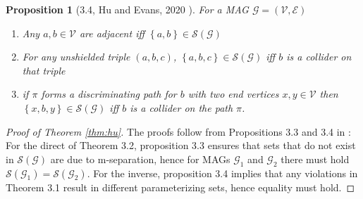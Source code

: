 \documentclass[a4paper]{article}
\newtheorem{proposition}{Proposition}
\begin{document}
\begin{proposition}[3.4, Hu and Evans, 2020 \cite{hu2020}]For a MAG $\mathcal{G} = (\mathcal{V},\mathcal{E})$
	\begin{enumerate}
		\item Any $a,b \in \mathcal{V}$ are adjacent iff $\left\{ a, b\right\} \in \mathcal{S}(\mathcal{G})$
		\item For any unshielded triple $(a,b,c)$, $\left\{ a, b, c \right\} \in \mathcal{S}(\mathcal{G})$ iff $b$ is a collider on that triple
		\item if $\pi$ forms a discriminating path for $b$ with two end vertices $x,y \in \mathcal{V}$ then $\left\{ x, b, y\right\} \in \mathcal{S}(\mathcal{G})$ iff $b$ is a collider on the path $\pi$. 
	\end{enumerate}
	
\end{proposition}

\begin{proof}[Proof of Theorem \ref{thm:hu}]
	The proofs follow from Propositions 3.3 and 3.4 in \cite{hu2020}: For the direct of Theorem 3.2, proposition 3.3 ensures that sets that do not exist in $\mathcal{S}(\mathcal{G})$ are due to m-separation, hence for MAGs $\mathcal{G}_1$ and $\mathcal{G}_2$ there must hold $\mathcal{S}(\mathcal{G}_1) = \mathcal{S}(\mathcal{G}_2)$. For the inverse, proposition 3.4 implies that any violations in Theorem 3.1 result in different parameterizing sets, hence equality must hold.
\end{proof}
\end{document}
